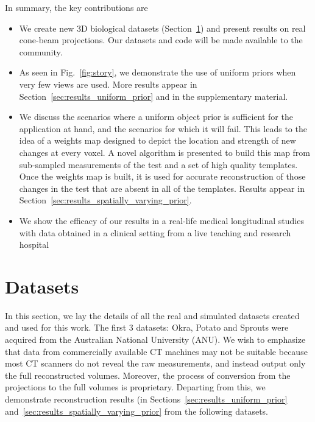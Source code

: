 \documentclass[journal]{IEEEtran}
\begin{document}
In summary, the key contributions are
\begin{itemize}
\item We create new 3D biological datasets (Section~\ref{sec:datasets}) and
  present results on real cone-beam projections. Our datasets and code
  will be made available to the community.
  \item As seen in Fig.~\ref{fig:story}, we demonstrate the use of
    uniform priors when very few views are used. More results appear
    in Section~\ref{sec:results_uniform_prior} and in the
    supplementary material.
  \item We discuss the scenarios where a uniform object prior is
    sufficient for the application at hand, and the scenarios for
    which it will fail. This leads to the idea of a weights map
    designed to depict the location and strength of new changes at
    every voxel. A novel algorithm is presented to build this map from
    sub-sampled measurements of the test and a set of high quality
    templates. Once the weights map is built, it is used for accurate
    reconstruction of those changes in the test that are absent in all
    of the templates. Results appear in
    Section~\ref{sec:results_spatially_varying_prior}.
  \item We show the efficacy of our results in a real-life medical
    longitudinal studies with data obtained in a clinical setting from
    a live teaching and
    research hospital 
\end{itemize}

\section{Datasets}
\label{sec:datasets}
In this section, we lay the details of all the real and simulated
datasets created and used for this work. The first 3 datasets: Okra, Potato and Sprouts were acquired from the Australian National University (ANU). We wish to emphasize that data from commercially
 available CT machines may not be suitable because most CT scanners do
 not reveal the raw measurements, and instead output only the full
 reconstructed volumes. Moreover, the process of conversion from the
 projections to the full volumes is proprietary. Departing from this, we
 demonstrate reconstruction results (in Sections~\ref{sec:results_uniform_prior} and~\ref{sec:results_spatially_varying_prior} from the following datasets.\\
\end{document}
